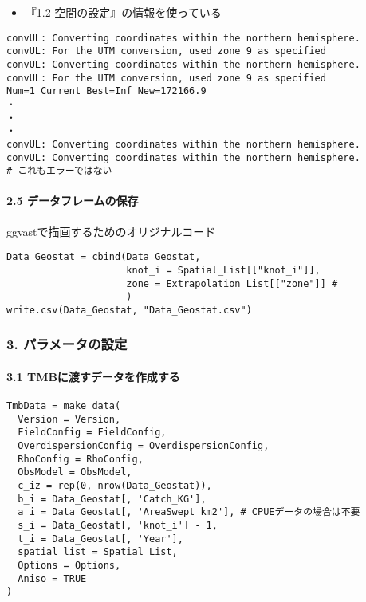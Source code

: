 \documentclass[]{article}
\providecommand{\tightlist}{%
  \setlength{\itemsep}{0pt}\setlength{\parskip}{0pt}}
\let\oldparagraph\paragraph
\renewcommand{\paragraph}[1]{\oldparagraph{#1}\mbox{}}
\begin{document}
\begin{itemize}
\tightlist
\item
  『1.2 空間の設定』の情報を使っている
\end{itemize}

\begin{verbatim}
convUL: Converting coordinates within the northern hemisphere.  
convUL: For the UTM conversion, used zone 9 as specified  
convUL: Converting coordinates within the northern hemisphere.  
convUL: For the UTM conversion, used zone 9 as specified  
Num=1 Current_Best=Inf New=172166.9  
・
・
・
convUL: Converting coordinates within the northern hemisphere.  
convUL: Converting coordinates within the northern hemisphere.  
# これもエラーではない
\end{verbatim}

\hypertarget{ux30c7ux30fcux30bfux30d5ux30ecux30fcux30e0ux306eux4fddux5b58}{%
\paragraph{2.5
データフレームの保存}\label{ux30c7ux30fcux30bfux30d5ux30ecux30fcux30e0ux306eux4fddux5b58}}

ggvastで描画するためのオリジナルコード

\begin{verbatim}
Data_Geostat = cbind(Data_Geostat,
                     knot_i = Spatial_List[["knot_i"]],
                     zone = Extrapolation_List[["zone"]] #
                     )    
write.csv(Data_Geostat, "Data_Geostat.csv")
\end{verbatim}

\hypertarget{ux30d1ux30e9ux30e1ux30fcux30bfux306eux8a2dux5b9a}{%
\subsubsection{3.
パラメータの設定}\label{ux30d1ux30e9ux30e1ux30fcux30bfux306eux8a2dux5b9a}}

\hypertarget{tmbux306bux6e21ux3059ux30c7ux30fcux30bfux3092ux4f5cux6210ux3059ux308b}{%
\paragraph{3.1
TMBに渡すデータを作成する}\label{tmbux306bux6e21ux3059ux30c7ux30fcux30bfux3092ux4f5cux6210ux3059ux308b}}

\begin{verbatim}
TmbData = make_data(
  Version = Version,
  FieldConfig = FieldConfig,
  OverdispersionConfig = OverdispersionConfig,
  RhoConfig = RhoConfig,
  ObsModel = ObsModel,
  c_iz = rep(0, nrow(Data_Geostat)),
  b_i = Data_Geostat[, 'Catch_KG'],
  a_i = Data_Geostat[, 'AreaSwept_km2'], # CPUEデータの場合は不要
  s_i = Data_Geostat[, 'knot_i'] - 1,
  t_i = Data_Geostat[, 'Year'],
  spatial_list = Spatial_List,
  Options = Options,
  Aniso = TRUE
)
\end{verbatim}
\end{document}
